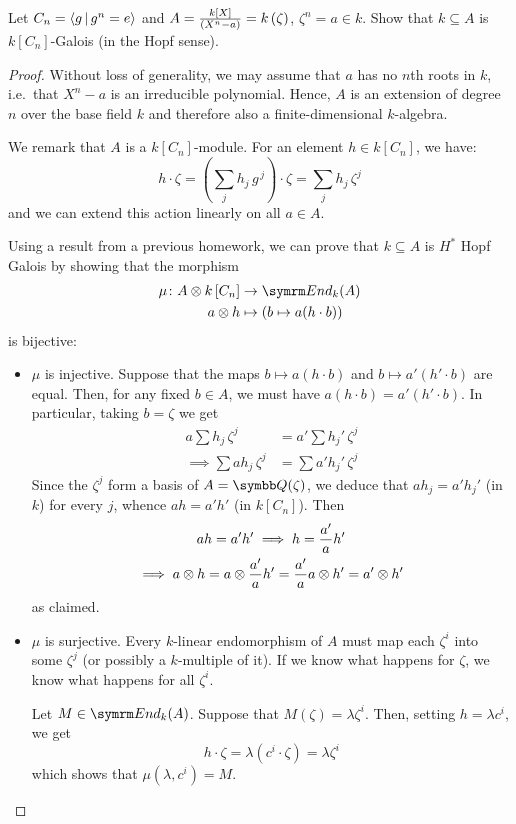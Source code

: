 \begin{exercise}
Let \(C_n = \generatedby{ g \vbar g^n = e }\) and \(A = \frac{k[X]}{(X^n - a)} = \adjoin[k]{\zeta}\), \(\zeta^n = a \in k\). Show that \(k \subseteq A\) is \(k[C_n]\)-Galois (in the Hopf sense).
\end{exercise}
\begin{proof}
Without loss of generality, we may assume that \(a\) has no \(n\)th roots in \(k\), i.e.\ that \(X^n - a\) is an irreducible polynomial. Hence, \(A\) is an extension of degree \(n\) over the base field \(k\) and therefore also a finite-dimensional \(k\)-algebra.

We remark that \(A\) is a \(k[C_n]\)-module. For an element \(h \in k[C_n]\), we have:
\[
    h \cdot \zeta = \left(\sum_{j} h_j \, g^{\, j}\right) \cdot \zeta = \sum_{j} h_j \, \zeta^j
\]
and we can extend this action linearly on all \(a \in A\).

Using a result from a previous homework, we can prove that \(k \subseteq A\) is \(H^*\) Hopf Galois by showing that the morphism
\begin{align*}
    \mu \colon A \tensor k\left[C_n\right] &\to \End_k (A) \\
    a \tensor h &\mapsto (b \mapsto a (h \cdot b))
\end{align*}
is bijective:
\begin{itemize}
    \item \(\mu\) is injective. Suppose that the maps \(b \mapsto a (h \cdot b)\) and \(b \mapsto a' (h' \cdot b)\) are equal. Then, for any fixed \(b \in A\), we must have \(a (h \cdot b) = a' (h' \cdot b)\). In particular, taking \(b = \zeta\) we get
    \begin{align*}
        a \sum h_j \, \zeta^j &= a' \sum h_j' \, \zeta^j \\
        \implies
        \sum a h_j \, \zeta^j &= \sum a' h_j' \, \zeta^j
    \end{align*}
    Since the \(\zeta^j\) form a basis of \(A = \rationals(\zeta)\), we deduce that \(a h_j = a' h_j'\) (in \(k\)) for every \(j\), whence \(ah = a' h'\) (in \(k [C_n]\)). Then
    \begin{gather*}
        ah = a'h' \implies h = \frac{a'}{a} h' \\
        \implies
        a \tensor h = a \tensor \frac{a'}{a} h' = \frac{a'}{a} a \tensor h' = a' \tensor h'
    \end{gather*}
    as claimed.

    \item \(\mu\) is surjective. Every \(k\)-linear endomorphism of \(A\) must map each \(\zeta^i\) into some \(\zeta^j\) (or possibly a \(k\)-multiple of it). If we know what happens for \(\zeta\), we know what happens for all \(\zeta^i\).
    
    Let \(M \in \End_k (A)\). Suppose that \(M(\zeta) = \lambda \zeta^i\). Then, setting \(h = \lambda c^i\), we get
    \[
        h \cdot \zeta = \lambda (c^i \cdot \zeta) = \lambda \zeta^i
    \]
    which shows that \(\mu(\lambda, c^i) = M\).
\end{itemize}
\end{proof}

